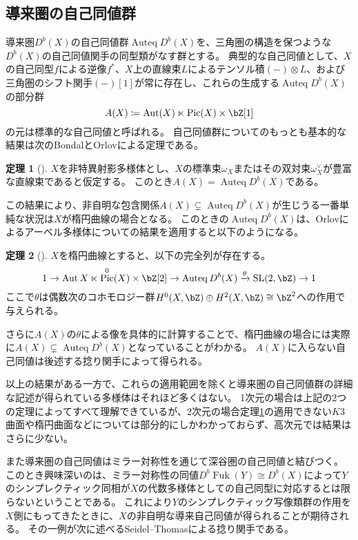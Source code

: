 \documentclass[uplatex,11pt,a4paper,dvipdfmx]{jsarticle}
\numberwithin{equation}{section}
\theoremstyle{definition}
\newtheorem{theorem}{定理}[section]
\DeclareMathOperator{\Auteq}{\mathrm{Auteq}}
\DeclareMathOperator{\Pic}{\mathrm{Pic}}
\DeclareMathOperator{\Aut}{\mathrm{Aut}}
\DeclareMathOperator{\SL}{\mathrm{SL}}
\DeclareMathOperator{\Fuk}{Fuk}
\begin{document}
\subsection{導来圏の自己同値群}
導来圏$D^b(X)$の自己同値群$\Auteq D^b(X)$を、三角圏の構造を保つような$D^b(X)$の自己同値関手の同型類がなす群とする。
典型的な自己同値として、$X$の自己同型$f$による逆像$f^*$、$X$上の直線束$L$によるテンソル積$(-)\otimes L$、および三角圏のシフト関手$(-)[1]$が常に存在し、これらの生成する$\Auteq D^b(X)$の部分群
\begin{equation}
    A(X) \coloneq \Aut(X) \ltimes \Pic(X) \times \bZ[1]
\end{equation}
の元は標準的な自己同値と呼ばれる。
自己同値群についてのもっとも基本的な結果は次のBondalとOrlovによる定理である。
\begin{theorem}[\cite{MR1818984}]\label{BO}
    $X$を非特異射影多様体とし、$X$の標準束$\omega_X$またはその双対束$\omega_X^\vee$が豊富な直線束であると仮定する。
    このとき$A(X) = \Auteq D^b(X)$である。
\end{theorem}
この結果により、非自明な包含関係$A(X) \subsetneq \Auteq D^b(X)$が生じうる一番単純な状況は$X$が楕円曲線の場合となる。
このときの$\Auteq D^b(X)$は、Orlovによるアーベル多様体についての結果\cite{MR1921811}を適用すると以下のようになる。
\begin{theorem}[\cite{MR1921811}]
    $X$を楕円曲線とすると、以下の完全列が存在する。
    \begin{equation}\label{eq:autoequivalence_of_elliptic_curve}
        1 \to \Aut{X} \ltimes \Pic^{0}(X)\times \bZ[2] \to \Auteq{D^b(X)} \xrightarrow{\theta} \SL(2, \bZ) \to 1
    \end{equation}
    ここで$\theta$は偶数次のコホモロジー群$H^0(X, \bZ) \oplus H^2(X, \bZ) \cong \bZ^2$への作用で与えられる。
\end{theorem}

さらに$A(X)$の$\theta$による像を具体的に計算することで、楕円曲線の場合には実際に$A(X) \subsetneq \Auteq D^b(X)$となっていることがわかる。
$A(X)$に入らない自己同値は後述する捻り関手によって得られる。

以上の結果がある一方で、これらの適用範囲を除くと導来圏の自己同値群の詳細な記述が得られている多様体はそれほど多くはない。
1次元の場合は上記の2つの定理によってすべて理解できているが、2次元の場合定理\ref{BO}の適用できない$K3$曲面や楕円曲面などについては部分的にしかわかっておらず、高次元では結果はさらに少ない。

また導来圏の自己同値はミラー対称性を通じて深谷圏の自己同値と結びつく。
このとき興味深いのは、ミラー対称性の同値$D^b \Fuk(Y) \cong D^b (X)$によって$Y$のシンプレクティック同相が$X$の代数多様体としての自己同型に対応するとは限らないということである。
これにより$Y$のシンプレクティック写像類群の作用を$X$側にもってきたときに、$X$の非自明な導来自己同値が得られることが期待される。
その一例が次に述べるSeidel--Thomasによる捻り関手である。
\end{document}
